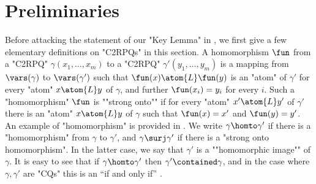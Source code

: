 \section{\AP{}Preliminaries}
\label{sec:prelim}

Before attacking the statement of our "Key Lemma" in ,
we first give a few elementary definitions on "C2RPQs" in this section.
%
\AP
A homomorphism $\fun$ from a "C2RPQ" $\gamma(x_1, \dotsc, x_m)$ to a "C2RPQ" $\gamma'(y_1, \dotsc, y_m)$ is a mapping from $\vars(\gamma)$ to $\vars(\gamma')$ such that $\fun(x) \atom{L} \fun(y)$ is an "atom" of $\gamma'$ for every "atom" $x \atom{L} y$ of $\gamma$, and further $\fun(x_i)=y_i$ for every $i$.
Such a "homomorphism" $\fun$ is \AP""strong onto"" if for every "atom" $x' \atom{L} y'$ of $\gamma'$ there is an "atom" $x \atom{L} y$ of $\gamma$ such that $\fun(x)=x'$ and $\fun(y)=y'$.
An example of "homomorphism" is provided in .
We write $\gamma \homto \gamma'$ if there is a "homomorphism" from $\gamma$ to $\gamma'$, and $\gamma \surj \gamma'$ if there is a "strong onto homomorphism".
In the latter case, we say that $\gamma'$ is a \AP""homomorphic image"" of $\gamma$.
It is easy to see that if $\gamma \homto \gamma'$ then $\gamma' \contained \gamma$, and in the case where $\gamma,\gamma'$ are "CQs" this is an ``if and only if'' \cite[Lemma~13]{ChandraMerlin1977Implementation}.
%
